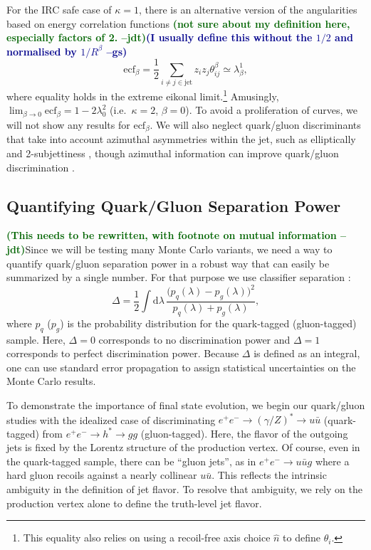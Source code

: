 \documentclass[11pt]{cernrep}
\newcommand{\jdt}[1]{\textbf{\textcolor{darkgreen}{(#1 --jdt)}}}
\newcommand{\gs}[1]{\textbf{\textcolor{darkblue}{(#1 --gs)}}}
\begin{document}
For the IRC safe case of $\kappa = 1$, there is an alternative version
of the angularities based on energy correlation functions \jdt{not
  sure about my definition here, especially factors of 2.}\gs{I
  usually define this without the $1/2$ and normalised by $1/R^\beta$}
\begin{equation}
\text{ecf}_\beta = \frac{1}{2}\sum_{i \not= j \in \text{jet}} z_i z_j \theta_{ij}^\beta \simeq \lambda^{1}_{\beta},
\end{equation}
where equality holds in the extreme eikonal limit.\footnote{This equality also relies on using a recoil-free axis choice $\hat{n}$ to define $\theta_i$.}  Amusingly, $\lim_{\beta \to 0} \text{ecf}_\beta = 1 - 2  \lambda^{2}_{0}$ \cite{} (i.e.~$\kappa = 2$, $\beta = 0$).  To avoid a proliferation of curves, we will not show any results for $\text{ecf}_\beta$.  We will also neglect quark/gluon discriminants that take into account azimuthal asymmetries within the jet, such as elliptically \cite{} and 2-subjettiness \cite{}, though azimuthal information can improve quark/gluon discrimination \cite{}.

\subsection{Quantifying Quark/Gluon Separation Power}
\label{quarkgluon_sec:ee}

\jdt{This needs to be rewritten, with footnote on mutual information}Since we will be testing many Monte Carlo variants, we need a way to quantify quark/gluon separation power in a robust way that can easily be summarized by a single number.  For that purpose we use classifier separation \cite{}:
\begin{equation}
\Delta =  \frac{1}{2} \int \text{d} \lambda \, \frac{\bigl(p_q(\lambda) - p_g(\lambda)\bigr)^2}{p_q(\lambda) + p_g(\lambda)},
\end{equation}
where $p_q$ ($p_g$) is the probability distribution for the quark-tagged (gluon-tagged) sample.  Here, $\Delta = 0$ corresponds to no discrimination power and $\Delta = 1$ corresponds to perfect discrimination power.  Because $\Delta$ is defined as an integral, one can use standard error propagation to assign statistical uncertainties on the Monte Carlo results.


To demonstrate the importance of final state evolution, we begin our quark/gluon studies with the idealized case of discriminating $e^+ e^- \to (\gamma/Z)^* \to u \bar{u}$ (quark-tagged) from $e^+ e^- \to h^* \to gg$ (gluon-tagged).  Here, the flavor of the outgoing jets is fixed by the Lorentz structure of the production vertex.  Of course, even in the quark-tagged sample, there can be ``gluon jets'', as in $e^+ e^- \to u \bar{u} g$ where a hard gluon recoils against a nearly collinear $u \bar{u}$.  This reflects the intrinsic ambiguity in the definition of jet flavor.   To resolve that ambiguity, we rely on the production vertex alone to define the truth-level jet flavor.
\end{document}
